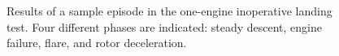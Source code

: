 \begin{figure}[htb!]
    \centering
    \caption{Results of a sample episode in the one-engine inoperative landing test. Four different phases are indicated: steady descent, engine failure, flare, and rotor deceleration.}
    \label{fig:results_landing}
\end{figure}

\FloatBarrier